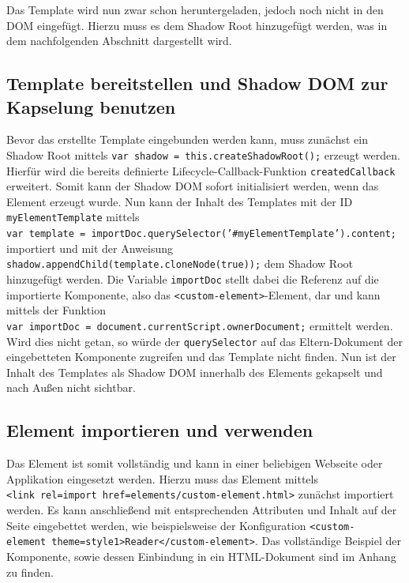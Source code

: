 Das Template wird nun zwar schon heruntergeladen, jedoch noch nicht in den DOM eingefügt. Hierzu muss es dem Shadow Root hinzugefügt werden, was in dem nachfolgenden Abschnitt dargestellt wird.


\subsection{Template bereitstellen und Shadow DOM zur Kapselung benutzen}\label{template-bereitstellen-und-shadow-dom-zur-kapselung-benutzen}

Bevor das erstellte Template eingebunden werden kann, muss zunächst ein Shadow Root mittels \texttt{var\ shadow\ =\ this.createShadowRoot();} erzeugt werden. Hierfür wird die bereits definierte Lifecycle-Callback-Funktion \texttt{createdCallback} erweitert. Somit kann der Shadow DOM sofort initialisiert werden, wenn das Element erzeugt wurde. Nun kann der Inhalt des Templates mit der ID \texttt{myElementTemplate} mittels \texttt{var\ template\ =\ importDoc.querySelector('\#myElementTemplate').content;} importiert und mit der Anweisung \texttt{shadow.appendChild(template.cloneNode(true));} dem Shadow Root hinzugefügt werden. Die Variable \texttt{importDoc} stellt dabei die Referenz auf die importierte Komponente, also das \texttt{\textless{}custom-element\textgreater{}}-Element, dar und kann mittels der Funktion \texttt{var\ importDoc\ =\ document.currentScript.ownerDocument;} ermittelt werden. Wird dies nicht getan, so würde der \texttt{querySelector} auf das Eltern-Dokument der eingebetteten Komponente zugreifen und das Template nicht finden. Nun ist der Inhalt des Templates als Shadow DOM innerhalb des Elements gekapselt und nach Außen nicht sichtbar.

\subsection{Element importieren und verwenden}\label{element-importieren-und-verwenden}

Das Element ist somit vollständig und kann in einer beliebigen Webseite oder Applikation eingesetzt werden. Hierzu muss das Element mittels \texttt{\textless{}link\ rel=\dq import\dq\ href=\dq elements/custom-element.html\dq\textgreater{}} zunächst importiert werden. Es kann anschließend mit entsprechenden Attributen und Inhalt auf der Seite eingebettet werden, wie beispielsweise der Konfiguration \texttt{\textless{}custom-element\ theme=\dq style1\dq\textgreater{}Reader\textless{}/custom-element\textgreater{}}. Das vollständige Beispiel der Komponente, sowie dessen Einbindung in ein HTML-Dokument sind im Anhang zu finden.

